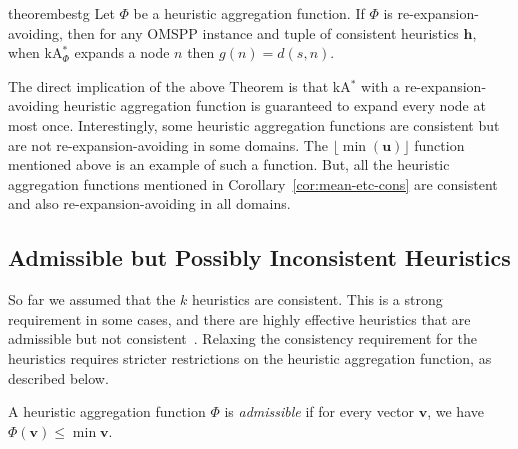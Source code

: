\documentclass[smallextended]{svjour3}       %
\newcommand{\omspp}{\ac{OMSPP}\xspace}
\newcommand{\kastar}{kA$^*$\xspace}
\newcommand{\kastarphi}{\textup{kA}$^*_{\Phi}$\xspace}
\newcommand{\axiomadm}{admissible\xspace}
\newcommand{\axiomcons}{consistent\xspace}
\newcommand{\axiomreexp}{re-expansion-avoiding\xspace}
\newcommand{\axiomconsnoun}{consistency\xspace}
\newcommand{\vect}[1]{\mathbf{#1}}
\begin{document}
\begin{restatable}{theorem}{bestg}
  \label{thm:bestg2}
  Let $\Phi$ be a heuristic aggregation function.
  If $\Phi$ is \axiomreexp, then for any \omspp instance and tuple of consistent heuristics $\vect{h}$,
       when \kastarphi expands a node $n$ then $g(n)=d(s,n)$.
\end{restatable}

The direct implication of the above Theorem is that \kastar with a \axiomreexp heuristic aggregation function is guaranteed to expand every node at most once.  
Interestingly, some heuristic aggregation functions are \axiomcons but are not \axiomreexp in some domains. 
The $\lfloor\min(\vect{u})\rfloor$ function mentioned above is an example of such a function. 
But, all the heuristic aggregation functions mentioned in Corollary~\ref{cor:mean-etc-cons} are \axiomcons and also \axiomreexp in all domains. 






\subsection{Admissible but Possibly Inconsistent Heuristics}
\label{sec:admissibleButPossible}
So far we assumed that the $k$ heuristics are consistent.
This is a strong requirement in some cases, and there are highly effective heuristics that are admissible but not consistent~\cite{FelnerZHSSZ11}.
Relaxing the consistency requirement for the heuristics requires stricter restrictions on the heuristic aggregation function, as described below. 

\begin{definition}
  A heuristic aggregation function $\Phi$ is \emph{\axiomadm} if for every vector $\vect{v}$, we have $\Phi(\vect{v}) \leq \min \vect{v}$.
\end{definition}
\end{document}
